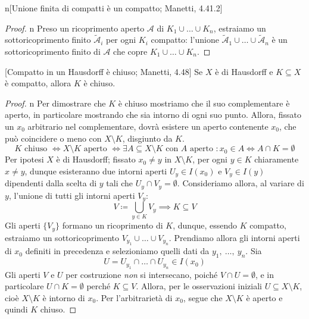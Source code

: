 \begin{lemma}{n}[Unione finita di compatti è un compatto; Manetti, 4.41.2]
\end{lemma}
\begin{proof}{n}
Preso un ricoprimento aperto $\mathcal{A}$ di $K_1\cup\ldots\cup K_n$, estraiamo un sottoricoprimento finito $\widetilde{\mathcal{A}}_i$ per ogni $K_i$ compatto: l'unione $\widetilde{\mathcal{A}}_1\cup\ldots\cup \widetilde{\mathcal{A}}_n$ è un sottoricoprimento finito di $\mathcal{A}$ che copre $K_1\cup\ldots\cup K_n$.\qedhere
\end{proof}
\begin{theorem}{}[Compatto in un Hausdorff è chiuso; Manetti, 4.48]\label{compatto in hausdorff chiuso}
Se $X$ è di Hausdorff e $K\subseteq X$ è compatto, allora $K$ è chiuso.
\end{theorem}
\begin{proof}{n}
	Per dimostrare che $K$ è chiuso mostriamo che il suo complementare è aperto, in particolare mostrando che sia intorno di ogni suo punto.
	Allora, fissato un $x_0$ arbitrario nel complementare, dovrà esistere un aperto contenente $x_0$, che può coincidere o meno con $X\setminus K$, disgiunto da $K$.
		\begin{equation*}
				K \text{ chiuso } \iff X\setminus K \text{ aperto } \iff \exists A\subseteq X\setminus K \text{ con } A \text{ aperto } \colon x_0\in A \iff A\cap K=\emptyset
		\end{equation*}
	Per ipotesi $X$ è di Hausdorff; fissato $x_0\neq y$ in $X\setminus K$, per ogni $y\in K$ chiaramente $x\neq y$, dunque esisteranno due intorni aperti $U_y\in I(x_0)$ e $V_y\in I(y)$ dipendenti dalla scelta di $y$ tali che $U_y\cap V_y=\emptyset$. Consideriamo allora, al variare di $y$, l'unione di tutti gli intorni aperti $V_y$:
	\begin{equation*}
			V\coloneqq \bigcup_{y\in K}V_y \implies K\subseteq V
	\end{equation*}
	Gli aperti $\{V_y\}$ formano un ricoprimento di $K$, dunque, essendo $K$ compatto, estraiamo un sottoricoprimento $V_{y_1}\cup\ldots\cup V_{y_n}$. Prendiamo allora gli intorni aperti di $x_0$ definiti in precedenza e selezioniamo quelli dati da $y_1,\ \ldots,\ y_n$. Sia
	\begin{equation*}
		U=U_{y_1}\cap\ldots\cap U_{y_n} \in I(x_0)
	\end{equation*}
	Gli aperti $V$ e $U$ per costruzione \textit{non} si intersecano, poiché $V\cap U=\emptyset$, e in particolare $U\cap K=\emptyset$ perché $K\subseteq V$. Allora, per le osservazioni iniziali $U\subseteq X\setminus K$, cioè $X\setminus K$ è intorno di $x_0$. Per l'arbitrarietà di $x_0$, segue che $X\setminus K$ è aperto e quindi $K$ chiuso.\qedhere
\end{proof}
